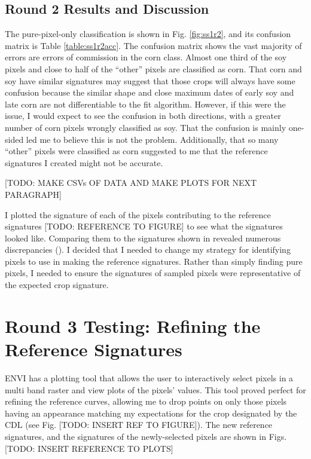 \subsection*{Round 2 Results and Discussion}

The pure-pixel-only classification is shown in Fig. \ref{fig:ss1r2}, and its confusion matrix is Table \ref{table:ss1r2acc}. The confusion matrix shows the vast majority of errors are errors of commission in the corn class. Almost one third of the soy pixels and close to half of the “other” pixels are classified as corn. That corn and soy have similar signatures may suggest that those crops will always have some confusion because the similar shape and close maximum dates of early soy and late corn are not differentiable to the fit algorithm. However, if this were the issue, I would expect to see the confusion in both directions, with a greater number of corn pixels wrongly classified as soy. That the confusion is mainly one-sided led me to believe this is not the problem. Additionally, that so many “other” pixels were classified as corn suggested to me that the reference signatures I created might not be accurate.

[TODO: MAKE CSVs OF DATA AND MAKE PLOTS FOR NEXT PARAGRAPH]

I plotted the signature of each of the pixels contributing to the reference signatures [TODO: REFERENCE TO FIGURE] to see what the signatures looked like. Comparing them to the signatures shown in \citeauthor{wardlow2005state-level} revealed numerous discrepancies \mkbibparens{\citeyear{wardlow2005state-level}}. I decided that I needed to change my strategy for identifying pixels to use in making the reference signatures. Rather than simply finding pure pixels, I needed to ensure the signatures of sampled pixels were representative of the expected crop signature.

\section{Round 3 Testing: Refining the Reference Signatures}
\label{appendix:testing:r3}

ENVI has a plotting tool that allows the user to interactively select pixels in a multi band raster and view plots of the pixels’ values. This tool proved perfect for refining the reference curves, allowing me to drop points on only those pixels having an appearance matching my expectations for the crop designated by the CDL (see Fig. [TODO: INSERT REF TO FIGURE]). The new reference signatures, and the signatures of the newly-selected pixels are shown in Figs. [TODO: INSERT REFERENCE TO PLOTS]

